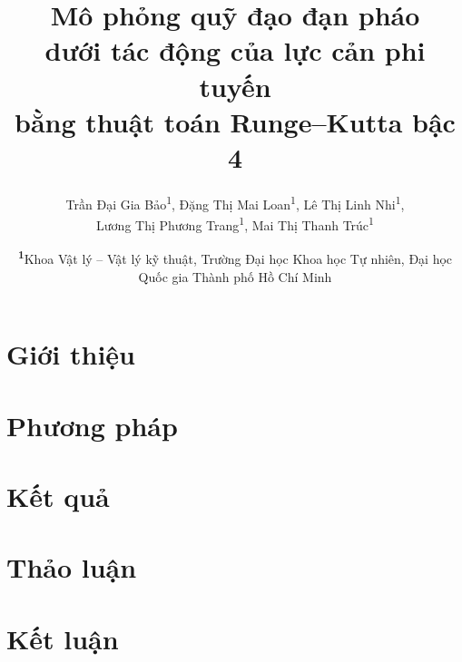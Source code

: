\documentclass[
	a4paper,
	10pt,
	unnumberedsections,
	twoside,
]{LTJournalArticle}
\title{Mô phỏng quỹ đạo đạn pháo\\
  dưới tác động của lực cản phi tuyến\\
  bằng thuật toán Runge--Kutta bậc 4}
\author{
	Trần Đại Gia Bảo\textsuperscript{1},
  Đặng Thị Mai Loan\textsuperscript{1},
  Lê Thị Linh Nhi\textsuperscript{1},\\
  Lương Thị Phương Trang\textsuperscript{1},
  Mai Thị Thanh Trúc\textsuperscript{1}
}
\date{\footnotesize\textsuperscript{\textbf{1}}Khoa Vật lý -- Vật lý kỹ thuật, Trường Đại học Khoa học Tự nhiên, Đại học Quốc gia Thành phố Hồ Chí Minh}
\begin{document}
\maketitle


\section{Giới thiệu}



\section{Phương pháp}


\section{Kết quả}



\section{Thảo luận}



\section{Kết luận}



\nocite{*}
\printbibliography

\end{document}
